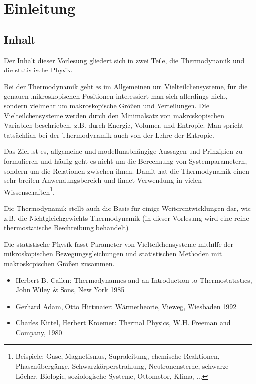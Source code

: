 
\chapter{Einleitung\label{einleitung}}



\section{Inhalt}

Der Inhalt dieser Vorlesung gliedert sich in zwei Teile, die Thermodynamik und die statistische Physik:

Bei der Thermodynamik geht es im Allgemeinen um Vielteilchensysteme, für die genauen mikroskopischen Positionen interessiert man sich allerdings nicht, sondern vielmehr um makroskopische Größen und Verteilungen.
Die Vielteilchensysteme werden durch den Minimalsatz von makroskopischen Variablen beschrieben, z.B. durch Energie, Volumen und Entropie.
Man spricht tatsächlich bei der Thermodynamik auch von der Lehre der Entropie.

Das Ziel ist es, allgemeine und modellunabhängige Aussagen und Prinzipien zu formulieren und häufig geht es nicht um die Berechnung von Systemparametern, sondern um die Relationen zwischen ihnen.
Damit hat die Thermodynamik einen sehr breiten Anwendungsbereich und findet Verwendung in vielen 
Wissenschaften\footnote{Beispiele: Gase, Magnetismus, Supraleitung, chemische Reaktionen, Phasenübergänge, Schwarzkörperstrahlung, Neutronensterne, schwarze Löcher, Biologie, soziologische Systeme, Ottomotor, Klima, ...}.

Die Thermodynamik stellt auch die Basis für einige Weiterentwicklungen dar, wie z.B. die Nichtgleich\-gewichts-Thermodynamik (in dieser Vorlesung wird eine reine thermostatische Beschreibung behandelt).

Die statistische Physik fasst Parameter von Vielteilchensysteme mithilfe der mikroskopischen Bewegungsgleichungen und statistischen Methoden mit makroskopischen Größen zusammen.



\begin{itemize}
	\item Herbert B. Callen: Thermodynamics and an Introduction to Thermostatistics, John Wiley \& Sons, New York 1985
	\item Gerhard Adam, Otto Hittmaier: Wärmetheorie, Vieweg, Wiesbaden 1992
	\item Charles Kittel, Herbert Kroemer: Thermal Physics, W.H. Freeman and Company, 1980
\end{itemize}

